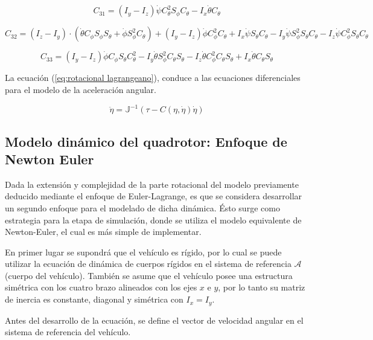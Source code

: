 \documentclass[\main/main.tex]{subfiles}
\begin{document}
\begin{equation}
C_{31}=(I_{y}-I_{z})\dot{\psi}C_{\theta}^{2}S_{\phi}C_{\theta}-I_{x}\dot{\theta}C_{\theta}
\end{equation}

\begin{equation}
C_{32}=(I_{z}-I_{y})\cdot(\dot{\theta}C_{\phi}S_{\phi}S_{\theta}+\dot{\phi}S_{\phi}^{2}C_{\theta})+(I_{y}-I_{z})\dot{\phi}C_{\phi}^{2}C_{\theta}+I_{x}\dot{\psi}S_{\theta}C_{\theta}-I_{y}\dot{\psi}S_{\phi}^{2}S_{\theta}C_{\theta}-I_{z}\dot{\psi}C_{\phi}^{2}S_{\theta}C_{\theta}
\end{equation}

\begin{equation}
C_{33}=(I_{y}-I_{z})\dot{\phi}C_{\phi}S_{\theta}C_{\theta}^{2}-I_{y}\dot{\theta}S_{\phi}^{2}C_{\theta}S_{\theta}-I_{z}\dot{\theta}C_{\phi}^{2}C_{\theta}S_{\theta}+I_{x}\dot{\theta}C_{\theta}S_{\theta}
\end{equation}

La ecuación (\ref{eq:rotacional lagrangeano}), conduce a las ecuaciones
diferenciales para el modelo de la aceleración angular.

\begin{equation}
\ddot{\eta}=\mathbb{J}^{-1}(\tau-C(\eta,\dot{\eta})\dot{\eta})
\end{equation}

\subsection{Modelo dinámico del quadrotor: Enfoque de Newton Euler}

Dada la extensión y complejidad de la parte rotacional del modelo
previamente deducido mediante el enfoque de Euler-Lagrange, es que
se considera desarrollar un segundo enfoque para el modelado de dicha
dinámica. Ésto surge como estrategia para la etapa de simulación,
donde se utiliza el modelo equivalente de Newton-Euler, el cual es
más simple de implementar. 

En primer lugar se supondrá que el vehículo es rígido, por lo cual
se puede utilizar la ecuación de dinámica de cuerpos rígidos en el
sistema de referencia $\mathcal{A}$ (cuerpo del vehículo). También
se asume que el vehículo posee una estructura simétrica con los cuatro
brazo alineados con los ejes $x$ e $y$, por lo tanto su matriz de
inercia es constante, diagonal y simétrica con $I_{x}=I_{y}$.

Antes del desarrollo de la ecuación, se define el vector de velocidad
angular en el sistema de referencia del vehículo.
\end{document}
